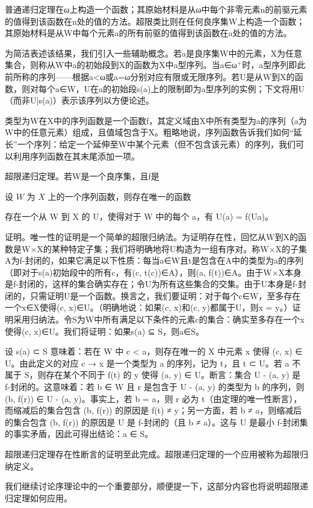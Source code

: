 \documentclass[12pt,a4paper]{ctexbook}
\theoremstyle{definition}
\theoremstyle{remark}
\begin{document}
{普通递归定理在ω上构造一个函数；其原始材料是从ω中每个非零元素n的前驱元素的值得到该函数在n处的值的方法。超限类比则在任何良序集W上构造一个函数；其原始材料是从W中每个元素a的所有前驱的值得到该函数在a处的值的方法。

为简洁表述该结果，我们引入一些辅助概念。若a是良序集W中的元素，X为任意集合，则称从W中a的初始段到X的函数为X中a型序列。当a∈ω$^{+}$时，a型序列即此前所称的序列——根据a<ω或a=ω分别对应有限或无限序列。若U是从W到X的函数，则对每个a∈W，U在a的初始段s(a)上的限制即为a型序列的实例；下文将用U（而非U|s(a)）表示该序列以方便论述。

类型为W在X中的序列函数是一个函数f，其定义域由X中所有类型为a的序列（a为W中的任意元素）组成，且值域包含于X。粗略地说，序列函数告诉我们如何“延长”一个序列：给定一个延伸至W中某个元素（但不包含该元素）的序列，我们可以利用序列函数在其末尾添加一项。

超限递归定理。若W是一个良序集，且f是

设 \( W \) 为 \( X \) 上的一个序列函数，则存在唯一的函数

存在一个从 W 到 X 的 U，使得对于 W 中的每个 a，有 U(a) = f(Ua)。

证明。唯一性的证明是一个简单的超限归纳法。为证明存在性，回忆从W到X的函数是W×X的某种特定子集；我们将明确地将U构造为一组有序对。称W×X的子集A为f-封闭的，如果它满足以下性质：每当a∈W且t是包含在A中的类型为a的序列（即对于s(a)初始段中的所有c，有(c, t(c))∈A），则(a, f(t))∈A。由于W×X本身是f-封闭的，这样的集合确实存在；令U为所有这些集合的交集。由于U本身是f-封闭的，只需证明U是一个函数。换言之，我们要证明：对于每个c∈W，至多存在一个x∈X使得(c, x)∈U。（明确地说：如果(c, x)和(c, y)都属于U，则x = y。）证明采用归纳法。令S为W中所有满足以下条件的元素c的集合：确实至多存在一个x使得(c, x)∈U。我们将证明：如果s(a) ⊆ S，则a∈S。

设 s(a) ⊂ S 意味着：若在 W 中 c < a，则存在唯一的 X 中元素 x 使得 (c, x) ∈ U。由此定义的对应 c → x 是一个类型为 a 的序列，记为 t，且 t ⊂ U。若 a 不属于 S，则存在某个不同于 f(t) 的 y 使得 (a, y) ∈ U。断言：集合 U - {(a, y)} 是 f-封闭的。这意味着：若 b ∈ W 且 r 是包含于 U - {(a, y)} 的类型为 b 的序列，则 (b, f(r)) ∈ U - {(a, y)}。事实上，若 b = a，则 r 必为 t（由定理的唯一性断言），而缩减后的集合包含 (b, f(r)) 的原因是 f(t) ≠ y；另一方面，若 b ≠ a，则缩减后的集合包含 (b, f(r)) 的原因是 U 是 f-封闭的（且 b ≠ a）。这与 U 是最小 f-封闭集的事实矛盾，因此可得出结论：a ∈ S。

超限递归定理存在性断言的证明至此完成。超限递归定理的一个应用被称为超限归纳定义。

我们继续讨论序理论中的一个重要部分，顺便提一下，这部分内容也将说明超限递归定理如何应用。

}
\end{document}

